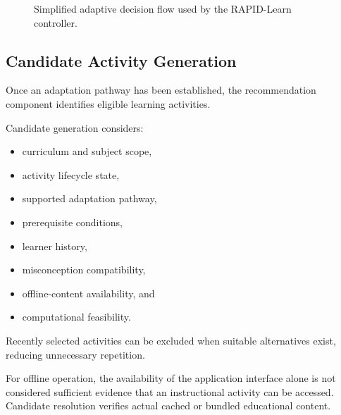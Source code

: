 \documentclass[conference]{IEEEtran}
\begin{document}
\begin{figure}[t]
{
}

\caption{Simplified adaptive decision flow used by the RAPID-Learn controller.}
\label{fig:adaptive_flow}
\end{figure}

\subsection{Candidate Activity Generation}

Once an adaptation pathway has been established, the recommendation component identifies eligible learning activities.

Candidate generation considers:

\begin{itemize}
    \item curriculum and subject scope,
    \item activity lifecycle state,
    \item supported adaptation pathway,
    \item prerequisite conditions,
    \item learner history,
    \item misconception compatibility,
    \item offline-content availability, and
    \item computational feasibility.
\end{itemize}

Recently selected activities can be excluded when suitable alternatives exist, reducing unnecessary repetition.

For offline operation, the availability of the application interface alone is not considered sufficient evidence that an instructional activity can be accessed. Candidate resolution verifies actual cached or bundled educational content.
\end{document}
